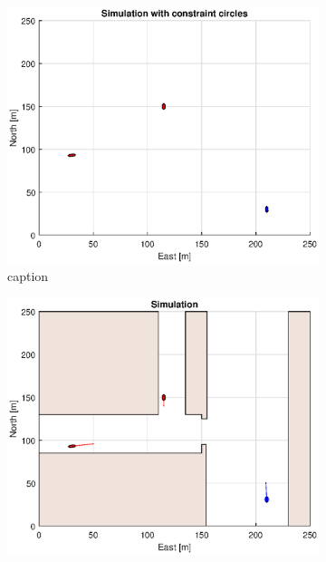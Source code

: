 \begin{figure}[!b] %
    \begin{subfigure}[b]{0.49\textwidth}
        \centering
        \includegraphics[width=\textwidth]{Images/Figures/Havn1/Simple1_f1_Frame1}
        \caption{caption}
    \end{subfigure}
    \hfill
    \begin{subfigure}[b]{0.499\textwidth}
        \centering
        \includegraphics[width=\textwidth]{Images/Figures/Havn1/Simple1_f600_Frame1}

\end{subfigure}
\end{figure}
